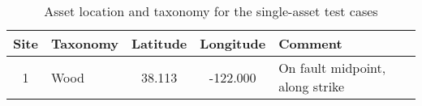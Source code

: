 \begin{table}

\centering
\begin{tabular}{ c l c c l }

\hline
\rowcolor{anti-flashwhite}
\bf{Site} & \bf{Taxonomy} & \bf{Latitude} & \bf{Longitude} & \bf{Comment} \\
\hline
1 & Wood & 38.113 & -122.000 & On fault midpoint, along strike \\
\hline
\end{tabular}

\caption{Asset location and taxonomy for the single-asset test cases}
\label{tab:asset}
\end{table}